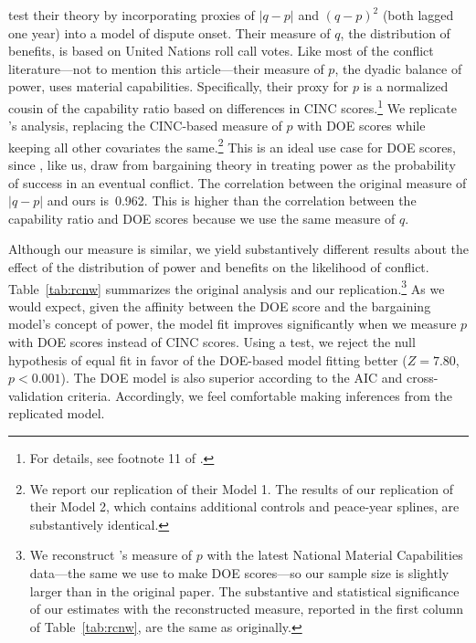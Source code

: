 \citeauthor{reed2008war} test their theory by incorporating proxies of $|q - p|$ and $(q - p)^2$ (both lagged one year) into a model of dispute onset.
Their measure of $q$, the distribution of benefits, is based on United Nations roll call votes.
Like most of the conflict literature---not to mention this article---their measure of $p$, the dyadic balance of power, uses material capabilities.
Specifically, their proxy for $p$ is a normalized cousin of the capability ratio based on differences in CINC scores.\footnote{%
  For details, see footnote 11 of \citet[1211]{reed2008war}.
}
We replicate \citeauthor{reed2008war}'s analysis, replacing the CINC-based measure of $p$ with DOE scores while keeping all other covariates the same.\footnote{%
  We report our replication of their Model 1.
  The results of our replication of their Model 2, which contains additional controls and peace-year splines, are substantively identical.
}
This is an ideal use case for DOE scores, since \citeauthor{reed2008war}, like us, draw from bargaining theory in treating power as the probability of success in an eventual conflict.
The correlation between the original measure of $|q - p|$ and ours is~0.962.
This is higher than the correlation between the capability ratio and DOE scores because we use the same measure of $q$.

\begin{table}[tp]
  \centering
  
  \caption{%
    Replication of Table 1, Model 1 of \citet[1213]{reed2008war}.
    The unit of analysis is the dyad-year, and the dependent variable is the onset of a militarized interstate dispute.
    The proportional reduction in loss over the null model comes from 100 repetitions of 10-fold cross-validation.
  }
  \label{tab:rcnw}
\end{table}

Although our measure is similar, we yield substantively different results about the effect of the distribution of power and benefits on the likelihood of conflict.
Table~\ref{tab:rcnw} summarizes the original analysis and our replication.\footnote{%
  We reconstruct \citeauthor{reed2008war}'s measure of $p$ with the latest National Material Capabilities data---the same we use to make DOE scores---so our sample size is slightly larger than in the original paper.
  The substantive and statistical significance of our estimates with the reconstructed measure, reported in the first column of Table~\ref{tab:rcnw}, are the same as originally.
}
As we would expect, given the affinity between the DOE score and the bargaining model's concept of power, the model fit improves significantly when we measure $p$ with DOE scores instead of CINC scores.
Using a \citet{Vuong:1989uf} test, we reject the null hypothesis of equal fit in favor of the DOE-based model fitting better ($Z = 7.80$, $p < 0.001$).
The DOE model is also superior according to the AIC and cross-validation criteria.
Accordingly, we feel comfortable making inferences from the replicated model.

